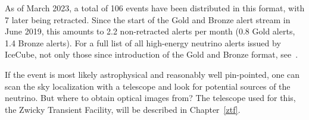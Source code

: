 As of March 2023, a total of 106 events have been distributed in this format, with 7 later being retracted. Since the start of the Gold and Bronze alert stream in June 2019, this amounts to 2.2 non-retracted alerts per month (0.8 Gold alerts, 1.4 Bronze alerts). For a full list of all high-energy neutrino alerts issued by IceCube, not only those since introduction of the Gold and Bronze format, see~\cite{Abbasi2023}.

If the event is most likely astrophysical and reasonably well pin-pointed, one can scan the sky localization with a telescope and look for potential sources of the neutrino. But where to obtain optical images from? The telescope used for this, the Zwicky Transient Facility, will be described in Chapter~\ref{ztf}.



